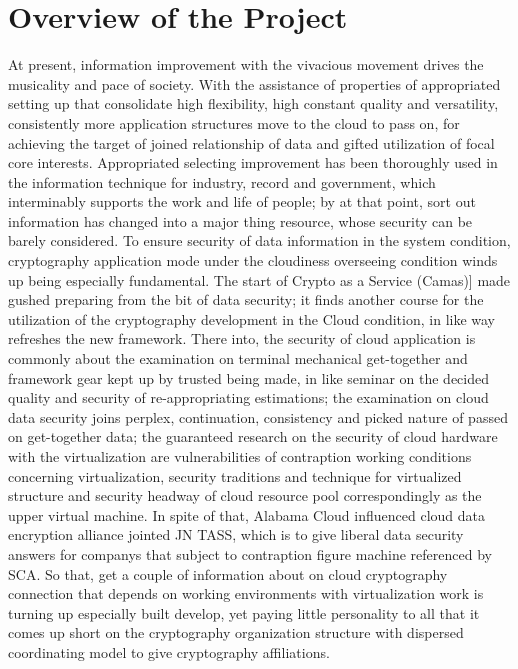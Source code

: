 \documentclass[BTech]{srmuthesis}
\begin{document}
\section{Overview of the Project}
At present, information improvement with the vivacious movement drives the musicality and pace of society. With the assistance of properties of appropriated setting up that consolidate high flexibility, high constant quality and versatility, consistently more application structures move to the cloud to pass on, for achieving the target of joined relationship of data and gifted utilization of focal core interests. Appropriated selecting improvement has been thoroughly used in the information technique for industry, record and government, which interminably supports the work and life of people; by at that point, sort out information has changed into a major thing resource, whose security can be barely considered. To ensure security of data information in the system condition, cryptography application mode under the cloudiness overseeing condition winds up being especially fundamental. The start of Crypto as a Service (Camas)] made gushed preparing from the bit of data security; it finds another course for the utilization of the cryptography development in the Cloud condition, in like way refreshes the new framework. There into, the security of cloud application is commonly about the examination on terminal mechanical get-together and framework gear kept up by trusted being made, in like seminar on the decided quality and security of re-appropriating estimations; the examination on cloud data security joins perplex, continuation, consistency and picked nature of passed on get-together data; the guaranteed research on the security of cloud hardware with the virtualization are vulnerabilities of contraption working conditions concerning virtualization, security traditions and technique for virtualized structure and security headway of cloud resource pool correspondingly as the upper virtual machine. In spite of that, Alabama Cloud influenced cloud data encryption alliance jointed JN TASS, which is to give liberal data security answers for companys that subject to contraption figure machine referenced by \ac{SCA}. So that, get a couple of information about on cloud cryptography connection that depends on working environments with virtualization work is turning up especially built develop, yet paying little personality to all that it comes up short on the cryptography organization structure with dispersed coordinating model to give cryptography affiliations.
\end{document}
